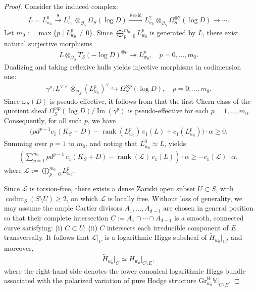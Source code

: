 \documentclass[11pt,letterpaper]{amsart}
\numberwithin{equation}{section}
\begin{document}
\begin{proof}
	Consider the induced complex:  
	\begin{align*}  
		L = L^0_{w_0} \xrightarrow{\,\theta\,} L^1_{w_0} \otimes_{\mathcal{O}_S} \Omega_S(\log D) \xrightarrow{\,\theta \otimes \mathrm{id}\,} L^2_{w_0} \otimes_{\mathcal{O}_S} \Omega_S^{\otimes 2}(\log D) \to \cdots.
	\end{align*}  
	Let $m_0 := \max\{p \mid L^p_{w_0} \neq 0\}$. Since $\bigoplus_{p=0}^{m_0} L^p_{w_0}$ is generated by $L$, there exist natural surjective morphisms  
	\begin{align*}
		L \otimes_{\mathcal{O}_S} T_S(-\log D)^{\otimes p} \twoheadrightarrow L^p_{w_0}, \quad p = 0, \dots, m_0.
	\end{align*}  
	Dualizing and taking reflexive hulls yields injective morphisms in codimension one:  
	\begin{align}\label{align_gammap}
		\gamma^p \colon L^{\vee\vee} \otimes_{\mathcal{O}_S} (L^p_{w_0})^\vee \hookrightarrow \Omega_S^{\otimes p}(\log D), \quad p = 0, \dots, m_0.
	\end{align}  	
	Since $\omega_S(D)$ is pseudo-effective, it follows from \cite[Theorem 1.2]{CP2019} that the first Chern class of the quotient sheaf $\Omega_S^{\otimes p}(\log D)/\operatorname{Im}(\gamma^p)$ is pseudo-effective for each $p = 1, \dots, m_0$. Consequently, for all such $p$, we have  
	\begin{align*}
		\big(p d^{p-1} c_1(K_S + D) - \operatorname{rank}(L^p_{w_0})\, c_1(L) + c_1(L^p_{w_0})\big) \cdot \alpha \geq 0.
	\end{align*}  
	Summing over $p = 1$ to $m_0$, and noting that $L^0_{w_0} \simeq L$, yields  
	\begin{align}\label{align_inequality1}
		\left( \sum_{p=1}^{m_0} p d^{p-1}\, c_1(K_S + D) - \operatorname{rank}(\mathcal{L})\, c_1(L) \right) \cdot \alpha \geq -c_1(\mathcal{L}) \cdot \alpha,
	\end{align}
	where $\mathcal{L} := \bigoplus_{p=0}^{m_0} L^p_{w_0}$.
	
	Since $\mathcal{L}$ is torsion-free, there exists a dense Zariski open subset $U \subset S$, with $\operatorname{codim}_S(S \setminus U) \geq 2$, on which $\mathcal{L}$ is locally free. Without loss of generality, we may assume the ample Cartier divisors $A_1, \dots, A_{d-1}$ are chosen in general position so that their complete intersection $C := A_1 \cap \cdots \cap A_{d-1}$ is a smooth, connected curve satisfying:  
	(i) $C \subset U$;  
	(ii) $C$ intersects each irreducible component of $E$ transversally.  
	It follows that $\mathcal{L}|_C$ is a logarithmic Higgs subsheaf of $\widetilde{H}_{w_0}|_C$, and moreover,  
	\[
	\widetilde{H}_{w_0}|_C \simeq \widetilde{H_{w_0}|_{C \setminus E}},
	\]  
	where the right-hand side denotes the lower canonical logarithmic Higgs bundle associated with the polarized variation of pure Hodge structure $\mathrm{Gr}^W_{w_0} \mathbb{V}|_{C \setminus E}$.
	

\end{proof}
\end{document}
